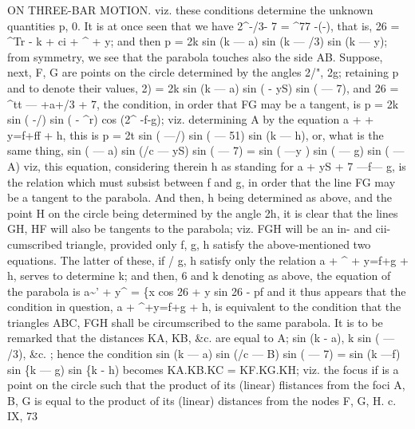 \documentclass[11pt,a4paper]{book}
\begin{document}
\guillemotright{}
ON THREE-BAR MOTION.
viz.
these
conditions
determine
the unknown
quantities
p,
0.
It
is
at
once
seen
that
we have
2\textasciicircum{}-/3- 7 = \textasciicircum{}77 -(\guillemotleft{}-\guillemotleft{}),
that
is,
26 = \textasciicircum{}Tr - k +
ci + \textasciicircum{} + y;
and then
p = 2k sin (k --- a) sin (k --- /3) sin (k --- y);
from symmetry, we see that the parabola touches
also the
side AB.
Suppose,
next,
F, G
are
points
on
the
circle
determined
by
the
angles
2/",
2g;
retaining p and
to denote
their values,
2) = 2k sin (k --- a) sin (\guillemotleft{} - yS) sin (\guillemotleft{} --- 7), and 26 = \textasciicircum{}tt --- \guillemotleft{}+a+/3 + 7,
the condition,
in order that FG may be a tangent,
is
p = 2k sin (\guillemotleft{} -/) sin (\guillemotleft{} - \textasciicircum{}r) cos (2\textasciicircum{} -f-g);
viz. determining A by the equation
a +
+ y=f+ff + h,
this
is
p = 2t sin (\guillemotleft{} ---/) sin (\guillemotleft{} --- 51) sin (k --- h),
or, what
is the same
thing,
sin (\guillemotleft{} --- a) sin (/c --- yS) sin (\guillemotleft{} --- 7) = sin (\guillemotleft{} ---y ) sin (\guillemotleft{} --- g) sin (\guillemotleft{} --- A)
viz,
this
equation,
considering
therein
h
as
standing
for
a + yS + 7 ---f--- g,
is
the
relation
which
must
subsist
between f and
g,
in
order
that
the
line FG may
be
a
tangent
to
the
parabola.
And
then,
h
being
determined
as
above,
and
the
point H
on
the
circle
being
determined
by
the
angle
2h,
it
is
clear
that
the
lines GH, HF
will
also
be
tangents
to
the
parabola;
viz. FGH
will
be
an
in-
and
cii-cumscribed
triangle,
provided
only f,
g,
h
satisfy
the
above-mentioned
two
equations.
The
latter
of
these,
if /
g, h
satisfy
only
the
relation
a + \textasciicircum{} + y=f+g + h,
serves
to
determine
k;
and
then, 6 and k denoting as above, the equation
of the parabola
is
a\textasciitilde{}' + y\textasciicircum{} = \{x cos 26 + y sin 26 - pf
and
it
thus
appears
that
the
condition
in
question,
a + \textasciicircum{}+y=f+g + h,
is equivalent
to
the
condition
that
the
triangles ABC, FGH
shall
be
circumscribed
to
the
same
parabola.
It
is
to
be
remarked
that
the
distances KA, KB,
\&c.
are
equal
to
A; sin (k - a),
k sin (\guillemotleft{} --- /3), \&c.
;
hence
the condition
sin (k --- a) sin (/c --- B) sin (\guillemotleft{} --- 7) = sin (k ---f) sin \{k --- g) sin \{k - h)
becomes
KA.KB.KC = KF.KG.KH;
viz.
the
focus
if
is
a
point
on
the
circle
such
that
the
product
of
its
(linear)
flistances
from
the
foci
A,
B, G
is
equal
to
the
product
of
its
(linear)
distances
from
the nodes F, G, H.
c.
IX,
73
\end{document}
